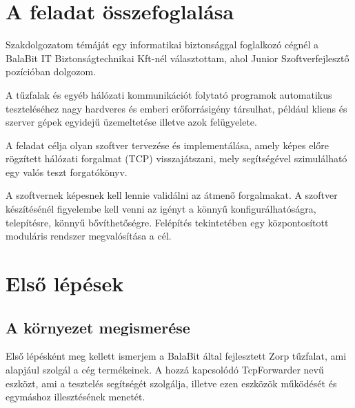 \documentclass[a4paper,12pt,oneside]{report}
\begin{document}
\section{A feladat összefoglalása}

Szakdolgozatom témáját egy informatikai biztonsággal foglalkozó cégnél a BalaBit IT Biztonságtechnikai Kft-nél választottam, ahol Junior Szoftverfejlesztő pozícióban dolgozom.

A tűzfalak és egyéb hálózati kommunikációt folytató programok automatikus 
teszteléséhez nagy hardveres és emberi erőforrásigény társulhat, például kliens és szerver gépek egyidejű üzemeltetése illetve azok felügyelete.

A feladat célja olyan szoftver tervezése és implementálása, amely képes előre 
rögzített hálózati forgalmat (TCP) visszajátszani, mely segítségével szimulálható egy
valós teszt forgatókönyv. 

A szoftvernek képesnek kell lennie validálni az átmenő forgalmakat. 
A szoftver készítésénél figyelembe kell venni az igényt a könnyű 
konfigurálhatóságra, telepítésre, könnyű bővíthetőségre. Felépítés tekintetében egy 
központosított moduláris rendszer megvalósítása a cél.




\section{Első lépések}

\subsection{A környezet megismerése}

Első lépésként meg kellett ismerjem a BalaBit\cite{website:balabit} által fejlesztett Zorp tűzfalat, ami alapjául szolgál a cég termékeinek. A hozzá kapcsolódó TcpForwarder nevű eszközt, ami a tesztelés segítségét szolgálja, illetve ezen eszközök működését és egymáshoz illesztésének menetét.
\end{document}

